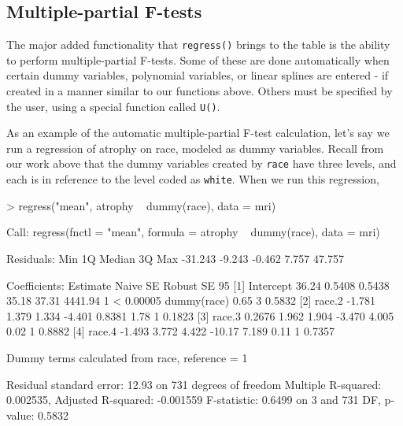 \documentclass[landscape]{article}
\renewenvironment{Schunk}{\vspace{\topsep}}{\vspace{\topsep}}
\begin{document}
\subsection{Multiple-partial F-tests}
The major added functionality that \texttt{regress()} brings to the table is the ability to perform multiple-partial F-tests. Some of these are done automatically when certain dummy variables, polynomial variables, or linear splines are entered - if created in a manner similar to our functions above. Others must be specified by the user, using a special function called \texttt{U()}.

As an example of the automatic multiple-partial F-test calculation, let's say we run a regression of atrophy on race, modeled as dummy variables. Recall from our work above that the dummy variables created by \texttt{race} have three levels, and each is in reference to the level coded as \texttt{white}. When we run this regression,
\begin{Schunk}
\begin{Sinput}
> regress("mean", atrophy ~ dummy(race), data = mri)
\end{Sinput}
\begin{Soutput}
Call:
regress(fnctl = "mean", formula = atrophy ~ dummy(race), data = mri)

Residuals:
    Min      1Q  Median      3Q     Max 
-31.243  -9.243  -0.462   7.757  47.757 

Coefficients:
                   Estimate  Naive SE  Robust SE    95%
[1] Intercept        36.24     0.5408    0.5438       35.18     37.31        4441.94 1  < 0.00005
    dummy(race)                                                                 0.65 3    0.5832 
[2]    race.2       -1.781     1.379     1.334       -4.401     0.8381          1.78 1    0.1823 
[3]    race.3        0.2676    1.962     1.904       -3.470     4.005           0.02 1    0.8882 
[4]    race.4       -1.493     3.772     4.422       -10.17     7.189           0.11 1    0.7357 

 Dummy terms calculated from race, reference = 1 

Residual standard error: 12.93 on 731 degrees of freedom
Multiple R-squared:  0.002535,	Adjusted R-squared:  -0.001559 
F-statistic: 0.6499 on 3 and 731 DF,  p-value: 0.5832
\end{Soutput}
\end{Schunk}
\end{document}
